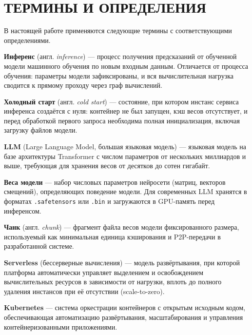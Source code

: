 \chapter*{ТЕРМИНЫ И ОПРЕДЕЛЕНИЯ}

В настоящей работе применяются следующие термины с соответствующими определениями.

\begin{sloppypar}

\textbf{Инференс} (англ. \textit{inference}) --- процесс получения предсказаний от обученной модели машинного обучения по новым входным данным. Отличается от процесса обучения: параметры модели зафиксированы, и вся вычислительная нагрузка сводится к прямому проходу через граф вычислений.

\textbf{Холодный старт} (англ. \textit{cold start}) --- состояние, при котором инстанс сервиса инференса создаётся с нуля: контейнер не был запущен, кэш весов отсутствует, и перед обработкой первого запроса необходима полная инициализация, включая загрузку файлов модели.

\textbf{LLM} (Large Language Model, большая языковая модель) --- языковая модель на базе архитектуры Transformer с числом параметров от нескольких миллиардов и выше, требующая для хранения весов от десятков до сотен гигабайт.

\textbf{Веса модели} --- набор числовых параметров нейросети (матриц, векторов смещений), определяющих поведение модели. Для современных LLM хранятся в форматах \texttt{.safetensors} или \texttt{.bin} и загружаются в GPU-память перед инференсом.

\textbf{Чанк} (англ. \textit{chunk}) --- фрагмент файла весов модели фиксированного размера, используемый как минимальная единица кэширования и P2P-передачи в разработанной системе.

\textbf{Serverless} (бессерверные вычисления) --- модель развёртывания, при которой платформа автоматически управляет выделением и освобождением вычислительных ресурсов в зависимости от нагрузки, вплоть до полного удаления инстансов при её отсутствии (scale-to-zero).

\textbf{Kubernetes} --- система оркестрации контейнеров с открытым исходным кодом, обеспечивающая автоматизацию развёртывания, масштабирования и управления контейнеризованными приложениями.


\end{sloppypar}
